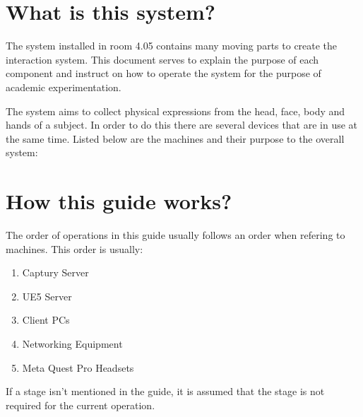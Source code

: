 \section{What is this system?}
The system installed in room 4.05 contains many moving parts to create the interaction system. This document serves to explain the purpose of each component and instruct on how to operate the system for the purpose of academic experimentation.

The system aims to collect physical expressions from the head, face, body and hands of a subject. In order to do this there are several devices that are in use at the same time. Listed below are the machines and their purpose to the overall system:

\section{How this guide works?}
The order of operations in this guide usually follows an order when refering to machines. This order is usually:
\begin{enumerate}
    \item Captury Server
    \item UE5 Server
    \item Client PCs
    \item Networking Equipment
    \item Meta Quest Pro Headsets
\end{enumerate}
If a stage isn't mentioned in the guide, it is assumed that the stage is not required for the current operation.